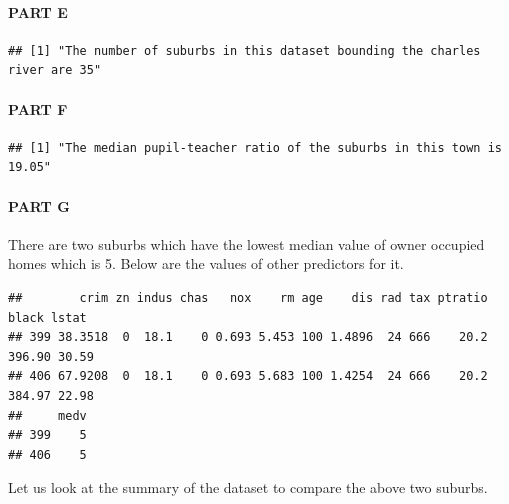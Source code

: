 \documentclass[
]{article}
\begin{document}
\pagebreak

\hypertarget{part-e}{%
\paragraph{PART E}\label{part-e}}

\begin{verbatim}
## [1] "The number of suburbs in this dataset bounding the charles river are 35"
\end{verbatim}

\hypertarget{part-f}{%
\paragraph{PART F}\label{part-f}}

\begin{verbatim}
## [1] "The median pupil-teacher ratio of the suburbs in this town is 19.05"
\end{verbatim}

\hypertarget{part-g}{%
\paragraph{PART G}\label{part-g}}

There are two suburbs which have the lowest median value of owner
occupied homes which is 5. Below are the values of other predictors for
it.

\begin{verbatim}
##        crim zn indus chas   nox    rm age    dis rad tax ptratio  black lstat
## 399 38.3518  0  18.1    0 0.693 5.453 100 1.4896  24 666    20.2 396.90 30.59
## 406 67.9208  0  18.1    0 0.693 5.683 100 1.4254  24 666    20.2 384.97 22.98
##     medv
## 399    5
## 406    5
\end{verbatim}

Let us look at the summary of the dataset to compare the above two
suburbs.
\end{document}
